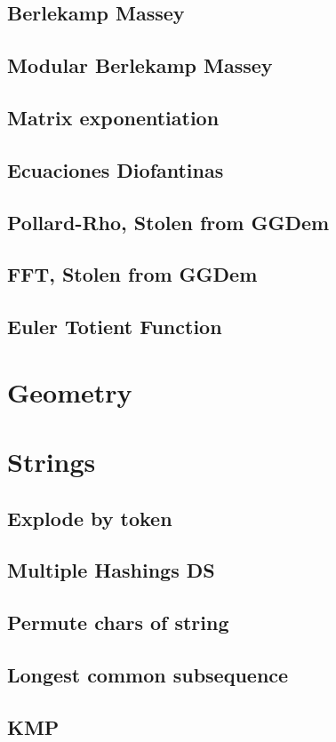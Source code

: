 \subsection{Berlekamp Massey}
\subsection{Modular Berlekamp Massey}
\subsection{Matrix exponentiation}
\subsection{Ecuaciones Diofantinas}
\subsection{Pollard-Rho, Stolen from GGDem}
\subsection{FFT, Stolen from GGDem}
\subsection{Euler Totient Function}
\section{Geometry}


\section{Strings}
\subsection{Explode by token}
\subsection{Multiple Hashings DS}
\subsection{Permute chars of string}
\subsection{Longest common subsequence}
\subsection{KMP}
